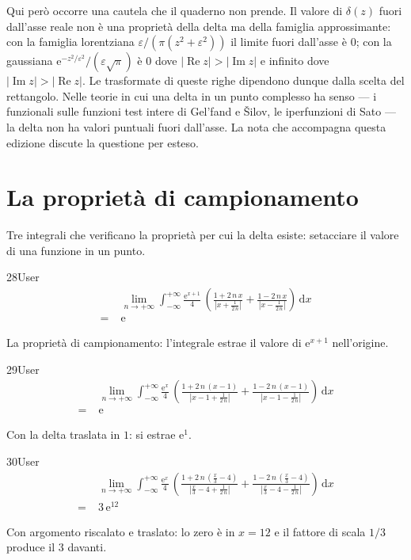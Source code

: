 Qui però occorre una cautela che il quaderno non prende. Il valore di $\delta(z)$ fuori dall'asse reale non è una proprietà della delta ma della famiglia approssimante: con la famiglia lorentziana $\varepsilon/\left(\pi(z^2+\varepsilon^2)\right)$ il limite fuori dall'asse è $0$; con la gaussiana $\mathrm{e}^{-z^2/\varepsilon^2}/(\varepsilon\sqrt\pi)$ è $0$ dove $|\operatorname{Re}z|>|\operatorname{Im}z|$ e infinito dove $|\operatorname{Im}z|>|\operatorname{Re}z|$. Le trasformate di queste righe dipendono dunque dalla scelta del rettangolo. Nelle teorie in cui una delta in un punto complesso ha senso — i funzionali sulle funzioni test intere di Gel'fand e Šilov, le iperfunzioni di Sato — la delta non ha valori puntuali fuori dall'asse. La nota che accompagna questa edizione discute la questione per esteso.

\section{La proprietà di campionamento}

Tre integrali che verificano la proprietà per cui la delta esiste: setacciare il valore di una funzione in un punto.

\begin{espr}{28}{User}{}
\begin{align*}
& \lim_{n \to +\infty} \int_{-\infty}^{+\infty} \frac{\mathrm{e}^{x + 1}}{4}\, \left(\frac{1 + 2\, n\, x}{\left|x + \frac{1}{2\, n}\right|} + \frac{1 - 2\, n\, x}{\left|x - \frac{1}{2\, n}\right|}\right) \,\mathrm{d}x \\
=\;& \mathrm{e}
\end{align*}
\end{espr}
La proprietà di campionamento: l'integrale estrae il valore di $\mathrm{e}^{x+1}$ nell'origine.

\begin{espr}{29}{User}{}
\begin{align*}
& \lim_{n \to +\infty} \int_{-\infty}^{+\infty} \frac{\mathrm{e}^{x}}{4}\, \left(\frac{1 + 2\, n\, \left(x - 1\right)}{\left|x - 1 + \frac{1}{2\, n}\right|} + \frac{1 - 2\, n\, \left(x - 1\right)}{\left|x - 1 - \frac{1}{2\, n}\right|}\right) \,\mathrm{d}x \\
=\;& \mathrm{e}
\end{align*}
\end{espr}
Con la delta traslata in $1$: si estrae $\mathrm{e}^1$.

\begin{espr}{30}{User}{}
\begin{align*}
& \lim_{n \to +\infty} \int_{-\infty}^{+\infty} \frac{\mathrm{e}^{x}}{4}\, \left(\frac{1 + 2\, n\, \left(\frac{x}{3} - 4\right)}{\left|\frac{x}{3} - 4 + \frac{1}{2\, n}\right|} + \frac{1 - 2\, n\, \left(\frac{x}{3} - 4\right)}{\left|\frac{x}{3} - 4 - \frac{1}{2\, n}\right|}\right) \,\mathrm{d}x \\
=\;& 3\, \mathrm{e}^{12}
\end{align*}
\end{espr}
Con argomento riscalato e traslato: lo zero è in $x=12$ e il fattore di scala $1/3$ produce il $3$ davanti.

